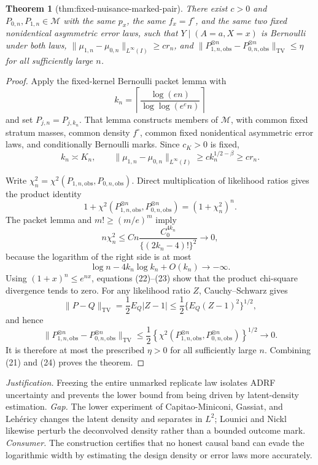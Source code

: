 \documentclass{article}
\newtheorem{theorem}{Theorem}
\begin{document}
\begin{theorem}[thm:fixed-nuisance-marked-pair]\label{thm:fixed-nuisance-marked-pair}
There exist \(c>0\) and \(P_{0,n},P_{1,n}\in\mathcal M\) with the same \(p_x\), the same \(f_x=f^{\circ}\), and the same two fixed nonidentical asymmetric error laws, such that \(Y\mid(A=a,X=x)\) is Bernoulli under both laws, \(\|\mu_{1,n}-\mu_{0,n}\|_{L^\infty(I)}\ge c r_n\), and \(\|P_{1,n,\mathrm{obs}}^{\otimes n}-P_{0,n,\mathrm{obs}}^{\otimes n}\|_{\mathrm{TV}}\le\eta\) for all sufficiently large \(n\).
\end{theorem}
\begin{proof}
Apply the fixed-kernel Bernoulli packet lemma with
\[
k_n=\left\lceil\frac{\log(en)}{\log\log(e^e n)}\right\rceil
\]
and set \(P_{j,n}=P_{j,k_n}\).  That lemma constructs members of \(\mathcal M\), with common fixed stratum masses, common density \(f^\circ\), common fixed nonidentical asymmetric error laws, and conditionally Bernoulli marks.  Since \(c_K>0\) is fixed,
\[
k_n\asymp K_n,
\qquad
\|\mu_{1,n}-\mu_{0,n}\|_{L^\infty(I)}
\ge c k_n^{1/2-\beta}\ge c r_n. \tag{21}
\]

Write \(\chi_n^2=\chi^2(P_{1,n,\mathrm{obs}},P_{0,n,\mathrm{obs}})\).  Direct multiplication of likelihood ratios gives the product identity
\[
1+\chi^2(P_{1,n,\mathrm{obs}}^{\otimes n},P_{0,n,\mathrm{obs}}^{\otimes n})
=(1+\chi_n^2)^n. \tag{22}
\]
The packet lemma and \(m!\ge(m/e)^m\) imply
\[
n\chi_n^2
\le Cn\frac{C_0^{4k_n}}{\{(2k_n-4)!\}^2}\longrightarrow0, \tag{23}
\]
because the logarithm of the right side is at most
\[
\log n-4k_n\log k_n+O(k_n)\longrightarrow-\infty.
\]
Using \((1+x)^n\le e^{nx}\), equations (22)--(23) show that the product chi-square divergence tends to zero.  For any likelihood ratio \(Z\), Cauchy--Schwarz gives
\[
\|P-Q\|_{\mathrm{TV}}
=\frac12E_Q|Z-1|
\le\frac12\{E_Q(Z-1)^2\}^{1/2},
\]
and hence
\[
\|P_{1,n,\mathrm{obs}}^{\otimes n}-P_{0,n,\mathrm{obs}}^{\otimes n}\|_{\mathrm{TV}}
\le\frac12\left\{\chi^2(P_{1,n,\mathrm{obs}}^{\otimes n},P_{0,n,\mathrm{obs}}^{\otimes n})\right\}^{1/2}
\longrightarrow0. \tag{24}
\]
It is therefore at most the prescribed \(\eta>0\) for all sufficiently large \(n\).  Combining (21) and (24) proves the theorem.
\end{proof}
\par\smallskip\noindent \textit{Justification.} Freezing the entire unmarked replicate law isolates ADRF uncertainty and prevents the lower bound from being driven by latent-density estimation. \textit{Gap.} The lower experiment of Capitao-Miniconi, Gassiat, and Lehéricy changes the latent density and separates in \(L^2\); Lounici and Nickl likewise perturb the deconvolved density rather than a bounded outcome mark. \textit{Consumer.} The construction certifies that no honest causal band can evade the logarithmic width by estimating the design density or error laws more accurately.
\end{document}
